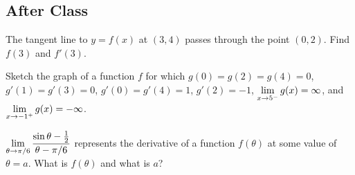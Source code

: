 \documentclass[notes]{subfiles}
\begin{document}
	\subsection*{After Class}
		\begin{ex}
			The tangent line to $y = f(x)$ at $(3,4)$ passes through the point $(0,2)$.  Find $f(3)$ and $f'(3)$.
		\end{ex}
			
		\begin{ex}
			Sketch the graph of a function $f$ for which $g(0) = g(2) = g(4) = 0$, $g'(1) = g'(3) = 0$, $g'(0) = g'(4) = 1$, $g'(2) = -1$, $\displaystyle \lim_{x\to 5^-} g(x) = \infty$, and $\displaystyle \lim_{x\to -1^+} g(x) = -\infty$.
		\end{ex}
			
		\begin{ex}
			$\displaystyle \lim_{\theta\to \pi/6} \dfrac{\sin\theta - \frac{1}{2}}{\theta - \pi/6}$ represents the derivative of a function $f(\theta)$ at some value of $\theta = a $.  What is $f(\theta)$ and what is $a$?
		\end{ex}	
			
	\clearpage
\end{document}
